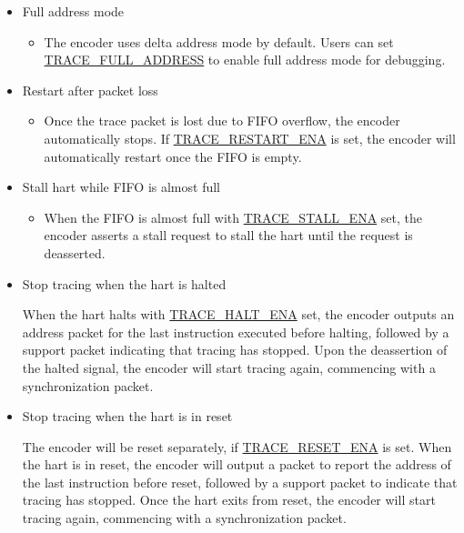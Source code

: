 \documentclass[main\_\_EN.tex]{subfiles}
\begin{document}
\begin{itemize}
    \item Full address mode
        \begin{itemize}
            \item The encoder uses delta address mode by default. Users can set \hyperref[fielddesc:TRACEFULLADDRESS]{TRACE\_FULL\_ADDRESS} to enable full address mode for debugging.
        \end{itemize}

        \item Restart after packet loss
            \begin{itemize}
                \item Once the trace packet is lost due to FIFO overflow, the encoder automatically stops. If \hyperref[fielddesc:TRACERESTARTENA]{TRACE\_RESTART\_ENA} is set, the encoder will automatically restart once the FIFO is empty.
            \end{itemize}

        \item Stall hart while FIFO is almost full
            \begin{itemize}
                \item When the FIFO is almost full with \hyperref[fielddesc:TRACESTALLENA]{TRACE\_STALL\_ENA} set, the encoder asserts a stall request to stall the hart until the request is deasserted.
            \end{itemize}

        \item Stop tracing when the hart is halted

            When the hart halts with \hyperref[fielddesc:TRACEHALTENA]{TRACE\_HALT\_ENA} set, the encoder outputs an address packet for the last instruction executed before halting, followed by a support packet indicating that tracing has stopped. Upon the deassertion of the halted signal, the encoder will start tracing again, commencing with a synchronization packet.

        \item Stop tracing when the hart is in reset

            The encoder will be reset separately, if \hyperref[fielddesc:TRACERESETENA]{TRACE\_RESET\_ENA} is set. When the hart is in reset, the encoder will output a packet to report the address of the last instruction before reset, followed by a support packet to indicate that tracing has stopped. Once the hart exits from reset, the encoder will start tracing again, commencing with a synchronization packet.


\end{itemize}
\end{document}
